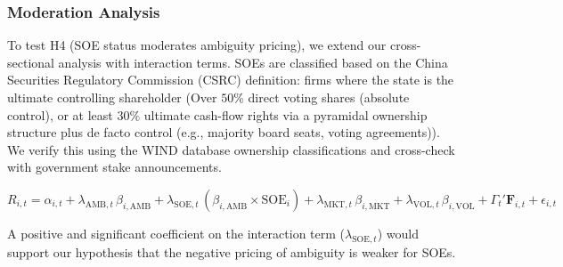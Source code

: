 \documentclass[preprint,12pt,authoryear]{elsarticle}
\begin{document}
\subsubsection{Moderation Analysis}

To test H4 (SOE status moderates ambiguity pricing), we extend our cross-sectional analysis with interaction terms. SOEs are classified based on the China Securities Regulatory Commission (CSRC) definition: firms where the state is the ultimate controlling shareholder (Over $50\%$ direct voting shares (absolute control), or at least $30\%$ ultimate cash-flow rights via a pyramidal ownership structure plus de facto control (e.g., majority board seats, voting agreements)). We verify this using the WIND database ownership classifications and cross-check with government stake announcements.

\begin{equation}
R_{i,t} = \alpha_{i,t} + \lambda_{\text{AMB},t} \, \beta_{i,\text{AMB}} + \lambda_{\text{SOE},t} \, (\beta_{i,\text{AMB}} \times \text{SOE}_i) + \lambda_{\text{MKT},t} \, \beta_{i,\text{MKT}} + \lambda_{\text{VOL},t} \, \beta_{i,\text{VOL}} + \Gamma_{t}' \mathbf{F}_{i,t} + \epsilon_{i,t}
\end{equation}

A positive and significant coefficient on the interaction term ($\lambda_{\text{SOE},t}$) would support our hypothesis that the negative pricing of ambiguity is weaker for SOEs.
\end{document}
